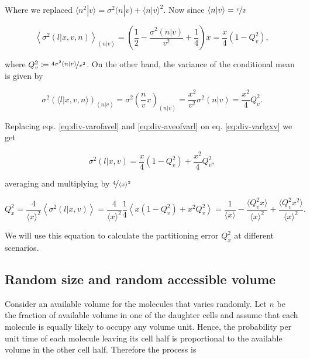 Where we replaced $\langle n^2|v\rangle = \sigma^2(n|v) + \langle n|v\rangle^2$. Now since $\langle n|v\rangle = \nicefrac{v}{2}$

\begin{equation}
  \label{eq:div-varofavel}
  \left\langle\sigma^2(l|x,v,n)\right\rangle_{(n|v)} = \left(\frac{1}{2} - \frac{\sigma^2(n|v)}{v^2} + \frac{1}{4}\right)x = \frac{x}{4}\left(1-Q_v^2\right),
\end{equation}

where $Q_v^2 \coloneqq \nicefrac{4\sigma^2(n|v)}{v^2}$. On the other hand, the variance of the conditional mean is given by

\begin{equation}
  \label{eq:div-aveofvarl}
  \sigma^2\left(\langle l|x,v,n\rangle\right)_{(n|v)} = \sigma^2\left(\frac{n}{v}x\right)_{(n|v)} = \frac{x^2}{v^2}\sigma^2(n|v) = \frac{x^2}{4}Q_v^2.
\end{equation}

Replacing eqs. \eqref{eq:div-varofavel} and \eqref{eq:div-aveofvarl} on eq. \eqref{eq:div-varlgxv} we get

\begin{equation*}
  \sigma^2(l|x,v) = \frac{x}{4}(1-Q_v^2)+\frac{x^2}{4}Q_v^2,
\end{equation*}

averaging and multiplying by $\nicefrac{4}{\langle x\rangle^2}$

\begin{equation}
  \label{eq:div-Qdis}
  Q_x^2 = \frac{4}{\langle x\rangle^2}\left\langle\sigma^2(l|x,v)\right\rangle = \frac{4}{\langle x\rangle^2}\frac{1}{4}\left\langle x(1-Q_v^2) + x^2Q_v^2 \right\rangle = \frac{1}{\langle x\rangle} - \frac{\langle Q_v^2x\rangle}{\langle x\rangle^2} + \frac{\langle Q_v^2x^2\rangle}{\langle x\rangle^2}.
\end{equation}

We will use this equation to calculate the partitioning error $Q_x^2$ at different scenarios.

\subsection{Random size and random accessible volume}

Consider an available volume for the molecules that varies randomly. Let $n$ be the fraction of available volume in one of the daughter cells and assume that each molecule is equally likely to occupy any volume unit. Hence, the probability per unit time of each molecule leaving its cell half is proportional to the available volume in the other cell half. Therefore the process is

